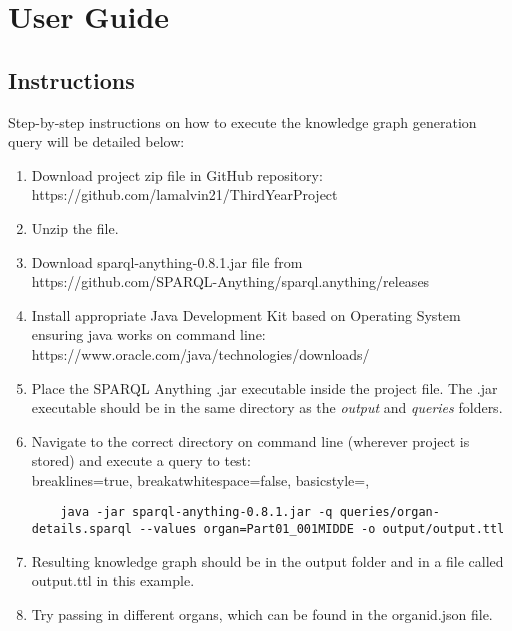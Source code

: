 \chapter{User Guide}
\section{Instructions}
Step-by-step instructions on how to execute the knowledge graph generation query will be detailed below:

\begin{enumerate}
    \item Download project zip file in GitHub repository: \\ https://github.com/lamalvin21/ThirdYearProject
    \item Unzip the file.
    \item Download sparql-anything-0.8.1.jar file from \\ https://github.com/SPARQL-Anything/sparql.anything/releases
    \item Install appropriate Java Development Kit based on Operating System ensuring java works on command line: \\ https://www.oracle.com/java/technologies/downloads/
    \item Place the SPARQL Anything .jar executable inside the project file. The .jar executable should be in the same directory as the \textit{output} and \textit{queries} folders. 
    \item Navigate to the correct directory on command line (wherever project is stored) and execute a query to test: \\ 
    \vspace{-0.4cm}
    \lstset
    {
        breaklines=true,
        breakatwhitespace=false,
        basicstyle=\linespread{1}\ttfamily,
    }
    \begin{lstlisting}
    java -jar sparql-anything-0.8.1.jar -q queries/organ-details.sparql --values organ=Part01_001MIDDE -o output/output.ttl
    \end{lstlisting}
    \vspace{-0.25cm}
        \item Resulting knowledge graph should be in the output folder and in a file called output.ttl in this example.
        \item Try passing in different organs, which can be found in the organid.json file.
\end{enumerate}
